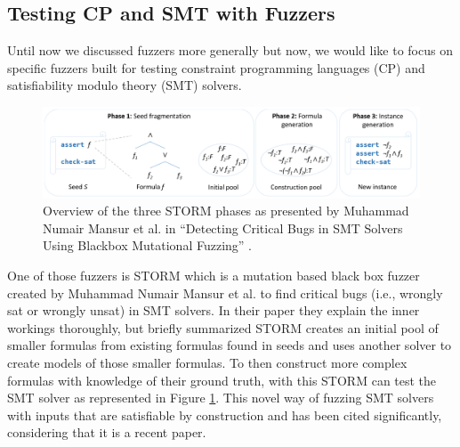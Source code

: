\subsection{Testing CP and SMT with Fuzzers}
\label{fuzzing:testingWithFuzzers}
Until now we discussed fuzzers more generally but now, we would like to focus on specific fuzzers built for testing constraint programming languages (CP) and satisfiability modulo theory (SMT) solvers.
\begin{figure}
	\centering
	\includegraphics[width=1.0\textwidth]{images/STORM}
	\caption{Overview of the three STORM phases as presented by Muhammad Numair Mansur et al. in “Detecting Critical Bugs in SMT Solvers Using Blackbox Mutational Fuzzing” \cite{1mansur2020detecting}.}
	\label{fig:STORM}
\end{figure}
One of those fuzzers is STORM which is a mutation based black box fuzzer created by Muhammad Numair Mansur et al. \cite{1mansur2020detecting} to find critical bugs (i.e., wrongly sat or wrongly unsat) in SMT solvers. In their paper \cite{1mansur2020detecting} they explain the inner workings thoroughly, but briefly summarized STORM creates an initial pool of smaller formulas from existing formulas found in seeds and uses another solver to create models of those smaller formulas. To then construct more complex formulas with knowledge of their ground truth, with this STORM can test the SMT solver as represented in Figure \ref{fig:STORM}. This novel way of fuzzing SMT solvers with inputs that are satisfiable by construction and has been cited significantly, considering that it is a recent paper.

